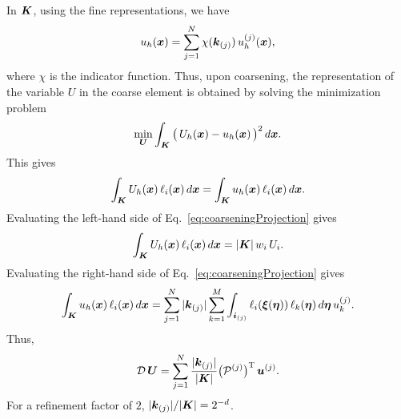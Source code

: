 \documentclass[10pt]{article}
\newcommand{\trans}{\textsc{T}}
\begin{document}
In $\boldsymbol{K}$, using the fine representations, we have
\begin{equation}
  u_{h}(\boldsymbol{x}) = \sum_{j=1}^{N}\chi(\boldsymbol{k}_{(j)})\,u_{h}^{(j)}(\boldsymbol{x}),
\end{equation}
where $\chi$ is the indicator function.  
Thus, upon coarsening, the representation of the variable $U$ in the coarse element is obtained by solving the minimization problem
\begin{equation}
  \min_{\boldsymbol{U}}\int_{\boldsymbol{K}}\big(\,U_{h}(\boldsymbol{x})-u_{h}(\boldsymbol{x})\,\big)^{2}\,d\boldsymbol{x}.
\end{equation}
This gives
\begin{equation}
  \int_{\boldsymbol{K}}U_{h}(\boldsymbol{x})\,\ell_{i}(\boldsymbol{x})\,d\boldsymbol{x}
  =\int_{\boldsymbol{K}}u_{h}(\boldsymbol{x})\,\ell_{i}(\boldsymbol{x})\,d\boldsymbol{x}.  
  \label{eq:coarseningProjection}
\end{equation}
Evaluating the left-hand side of Eq.~\eqref{eq:coarseningProjection} gives
\begin{equation}
  \int_{\boldsymbol{K}}U_{h}(\boldsymbol{x})\,\ell_{i}(\boldsymbol{x})\,d\boldsymbol{x}
  =|\boldsymbol{K}|\,w_{i}\,U_{i}.  
\end{equation}
Evaluating the right-hand side of Eq.~\eqref{eq:coarseningProjection} gives
\begin{equation}
  \int_{\boldsymbol{K}}u_{h}(\boldsymbol{x})\,\ell_{i}(\boldsymbol{x})\,d\boldsymbol{x}
  =\sum_{j=1}^{N}|\boldsymbol{k}_{(j)}|\sum_{k=1}^{M}\int_{\boldsymbol{i}_{(j)}}\ell_{i}(\boldsymbol{\xi}(\boldsymbol{\eta}))\,\ell_{k}(\boldsymbol{\eta})\,d\boldsymbol{\eta}\,u_{k}^{(j)}.
\end{equation}
Thus, 
\begin{equation}
  \mathcal{D}\,\vect{U}=\sum_{j=1}^{N}\f{|\vect{k}_{(j)}|}{|\vect{K}|}
  \big(\mathcal{P}^{(j)}\big)^{\trans}\,\vect{u}^{(j)}.  
\end{equation}
For a refinement factor of $2$, $|\boldsymbol{k}_{(j)}|/|\boldsymbol{K}|=2^{-d}$.  



\end{document}

